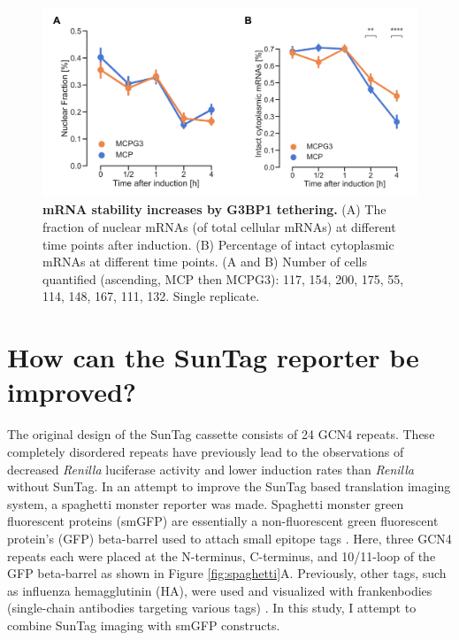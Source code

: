 \begin{figure}[h]
    \centering
    \includegraphics[width=\linewidth]{images/figure5}
    \caption{\textbf{mRNA stability increases by G3BP1 tethering.}
        (A) The fraction of nuclear mRNAs (of total cellular mRNAs)
            at different time points after induction.
        (B) Percentage of intact cytoplasmic mRNAs at different time points.
        (A and B) Number of cells quantified (ascending, MCP then MCPG3):
            117, 154, 200, 175, 55, 114, 148, 167, 111, 132. Single replicate.
    }
    \label{fig:mcp_treat}
\end{figure}


\section{How can the SunTag reporter be improved?} \label{spaghetti}

The original design of the SunTag cassette consists of 24 GCN4 repeats.
These completely disordered repeats have previously lead to the observations of decreased \textit{Renilla} luciferase activity and lower induction rates than \textit{Renilla} without SunTag.
In an attempt to improve the SunTag based translation imaging system, a spaghetti monster reporter was made.
Spaghetti monster green fluorescent proteins (smGFP) are essentially a non-fluorescent green fluorescent protein's (GFP) beta-barrel used to attach small epitope tags \cite{viswanathan_high-performance_2015}.
Here, three GCN4 repeats each were placed at the N-terminus, C-terminus, and 10/11-loop of the GFP beta-barrel as shown in Figure \ref{fig:spaghetti}A.
Previously, other tags, such as influenza hemagglutinin (HA), were used and visualized with frankenbodies (single-chain antibodies targeting various tags) \cite{zhao_genetically_2019}.
In this study, I attempt to combine SunTag imaging with smGFP constructs.


